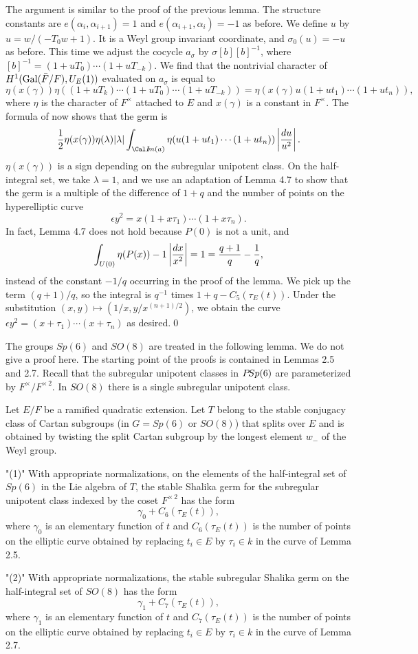   The argument is similar to the proof of the
previous lemma.  The structure constants are $e(\alpha_i,\alpha_{i+1})=1$
and $e(\alpha_{i+1},\alpha_i)= -1$ as
before.  We define $u$ by $u=w/(-T_0 w+1)$.  It is a Weyl group
invariant coordinate, and $\sigma_0(u) = -u$ as before.
This time we adjust the cocycle $a_\sigma$ by $\sigma[b][b]^{-1}$,
where $[b]^{-1} = (1+ u T_0)\cdots (1+ u T_{-k})$.  We find that
the nontrivial character of $H^1(\operatorname{Gal}({\bar F}/F),U_E(1))$ evaluated
on $a_\sigma$ is equal to 
$$\eta(x(\gamma))\eta((1+u T_k)\cdots (1+u T_0)\cdots (1+ u T_{-k})) =
\eta(x(\gamma) u (1+u t_1)\cdots (1+u t_n)),$$
where $\eta$ is the character of $F^\times$ attached to $E$
and $x(\gamma)$ is a constant in $F^\times$.  
The formula of \cite{H3,VII.5.5} now shows that the germ is
$${1\over 2}\eta(x(\gamma))\eta(\lambda)|\lambda|\int_{\Ima(a)}
   \eta(u (1+ u t_1)\cdots (1+u t_n))\left| {du\over u^2}\right|.$$
$\eta(x(\gamma))$ is a sign depending on the subregular unipotent class.
On the half-integral set, we take $\lambda=1$, and we use
an adaptation of Lemma 4.7 to show that the germ is a multiple
of the difference of $1+q$ and
the number of points on the hyperelliptic curve
$$\epsilon y^2 = x (1+ x\tau_1)\cdots (1+x \tau_n).$$
In fact, Lemma 4.7 does not hold because $P(0)$ is not a unit, and
$$\int_{U(0)} \eta(P(x))-1 \left| {dx\over x^2}\right | = 1 = 
{q+1\over q} - {1\over q},$$
instead of the constant $-1/q$ occurring
in the proof of the lemma.  We pick up the term $(q+1)/q$, so the
integral is $q^{-1}$ times $1+q-C_5(\tau_E(t))$.
Under the substitution $(x,y)\mapsto (1/x,y/x^{(n+1)/2})$, we
obtain the curve
$\epsilon y^2 = (x+\tau_1)\cdots (x+\tau_n)$
as desired.\qed\enddemo

\bigskip
The groups $Sp(6)$ and $SO(8)$ are treated in the following
lemma.  We do not give a proof here.  The starting point
of the proofs is contained in Lemmas 2.5 and 2.7.
Recall that the subregular unipotent classes in ${P\! Sp}(6)$
are parameterized by $F^\times/F^{\times\,2}$.  In $SO(8)$
there is a single subregular unipotent class.

  Let $E/F$ be a ramified quadratic
extension.  Let $T$ belong to  the stable conjugacy
class of Cartan subgroups
(in $G= Sp(6)$ or $SO(8)$) that splits over $E$ and
is obtained by twisting the split Cartan subgroup
by the longest element $w_-$ of the Weyl group.
\roster
\item"(1)" With appropriate normalizations, on the elements
of the half-integral set of $Sp(6)$ in the Lie algebra
of $T$,
the stable Shalika germ for the subregular unipotent
class indexed by the coset
$F^{\times\,2}$ has the form
$$\gamma_0 + C_6(\tau_E(t)),$$
where $\gamma_0$ is an elementary function of $t$
and $C_6(\tau_E(t))$ is the number of points on the elliptic
curve obtained by replacing $t_i\in E$ by
$\tau_i\in k$ in the curve of Lemma 2.5.
\item"(2)" With appropriate normalizations,
the stable  subregular
Shalika germ on the half-integral set of $SO(8)$ has the form
$$\gamma_1 + C_7(\tau_E(t)),$$
where $\gamma_1$ is an elementary function of $t$
and $C_7(\tau_E(t))$ is the number of points on the elliptic
curve obtained by replacing $t_i\in E$ by $\tau_i\in k$
in the curve of Lemma 2.7.
\endroster
\endproclaim


